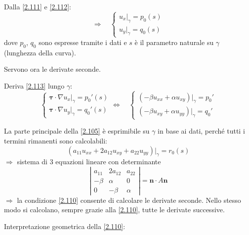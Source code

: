 \documentclass[a4paper,11pt]{report}
\newcommand{\vect}[1]{\boldsymbol{#1}}
\begin{document}
Dalla \eqref{2.111} e \eqref{2.112}:
\begin{equation}
\Rightarrow \quad 
\begin{cases}
u_x \big|_{\gamma}=p_0(s)\\
u_y \big|_{\gamma}=q_0(s)
\end{cases}
\label{2.113}
\end{equation}
dove $p_0$, $q_0$ sono espresse tramite i dati e $s$ \`e il parametro naturale su $\gamma$ (lunghezza della curva).

Servono ora le derivate seconde.

Deriva \eqref{2.113} lungo $\gamma$:
\[
\begin{cases}
\vect{\tau}\cdot \nabla u_x \big|_{\gamma}= p_0'(s)\\
\vect{\tau}\cdot \nabla u_y \big|_{\gamma}=q_0'(s)
\end{cases}
\Leftrightarrow \quad
\begin{cases}
(-\beta u_{xx} + \alpha u_{xy}) \big|_{\gamma}=p_0'\\
(-\beta u_{xy} + \alpha u_{yy}) \big|_{\gamma}=q_0'
\end{cases}
\]

La parte principale della \eqref{2.105} \`e esprimibile su $\gamma$ in base ai dati, perch\'e tutti i termini rimanenti sono calcolabili:
\[
(a_{11}u_{xx}+2a_{12}u_{xy}+a_{22}u_{yy}) \big|_{\gamma}=r_0(s)
\]
$\Rightarrow$ sistema di 3 equazioni lineare con determinante
\begin{equation}
\left| \begin{matrix}
a_{11} & 2a_{12} & a_{22}\\
-\beta & \alpha & 0 \\
0 & -\beta & \alpha 
\end{matrix}\right| = \vect{n}\cdot A \vect{n}
\label{2.114}
\end{equation}
$\Rightarrow$ la condizione \eqref{2.110} consente di calcolare le derivate seconde. Nello stesso modo si calcolano, sempre grazie alla \eqref{2.110}, tutte le derivate successive.

\medskip

Interpretazione geometrica della \eqref{2.110}: %
\end{document}
